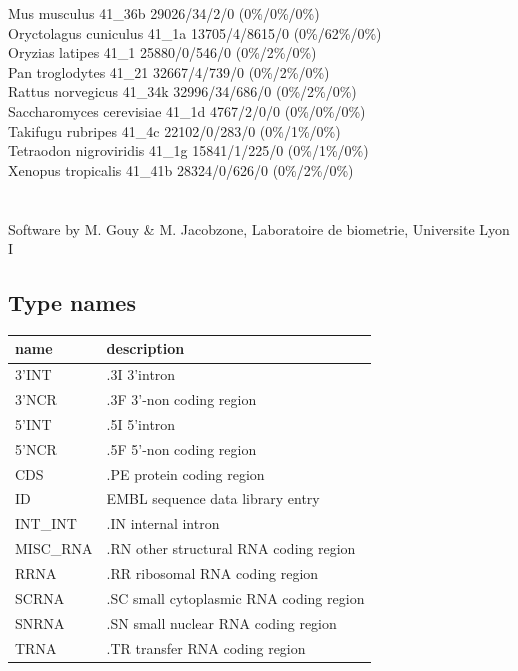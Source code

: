 \documentclass{article}
\begin{document}
\begin{Schunk}
Mus musculus                            41\_36b 29026/34/2/0 (0\%/0\%/0\%)\\
Oryctolagus cuniculus                   41\_1a 13705/4/8615/0 (0\%/62\%/0\%)\\
Oryzias latipes                         41\_1 25880/0/546/0 (0\%/2\%/0\%)\\
Pan troglodytes                         41\_21 32667/4/739/0 (0\%/2\%/0\%)\\
Rattus norvegicus                       41\_34k 32996/34/686/0 (0\%/2\%/0\%)\\
Saccharomyces cerevisiae                41\_1d 4767/2/0/0 (0\%/0\%/0\%)\\
Takifugu rubripes                       41\_4c 22102/0/283/0 (0\%/1\%/0\%)\\
Tetraodon nigroviridis                  41\_1g 15841/1/225/0 (0\%/1\%/0\%)\\
Xenopus tropicalis                      41\_41b 28324/0/626/0 (0\%/2\%/0\%)\\
\\
\\
Software by M. Gouy \& M. Jacobzone, Laboratoire de biometrie, Universite Lyon I

\subsection{Type names}
\noindent\begin{tabular}{ll}
\hline \hline
name & description\\
\hline
3'INT & .3I 3'intron \\
3'NCR & .3F  3'-non coding region \\
5'INT & .5I 5'intron \\
5'NCR & .5F  5'-non coding region \\
CDS & .PE protein coding region \\
ID & EMBL sequence data library entry \\
INT\_INT & .IN  internal intron \\
MISC\_RNA & .RN other structural RNA coding region \\
RRNA & .RR ribosomal RNA coding region \\
SCRNA & .SC small cytoplasmic RNA coding region \\
SNRNA & .SN small nuclear RNA coding region \\
TRNA & .TR transfer RNA coding region \\
\hline \hline
\end{tabular}


\end{Schunk}
\end{document}
